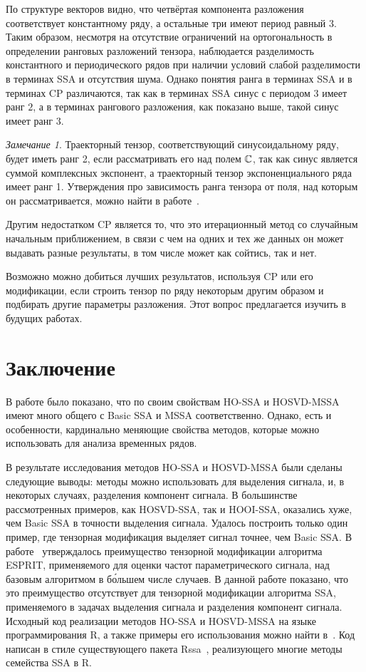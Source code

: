 \documentclass[specialist,
    substylefile = spbu.rtx,
    subf,href,colorlinks=true, 12pt]{disser}
\theoremstyle{plain}
\theoremstyle{definition}
\theoremstyle{remark}
\newtheorem*{remark}{Замечание}
\begin{document}
    По структуре векторов видно, что четвёртая компонента разложения соответствует константному ряду, а остальные три имеют период равный $3$.
    Таким образом, несмотря на отсутствие ограничений на ортогональность в определении ранговых разложений тензора, наблюдается
    разделимость константного и периодического рядов при наличии условий слабой разделимости в терминах SSA и отсутствия
    шума.
    Однако понятия ранга в терминах SSA и в терминах CP различаются, так как в терминах SSA синус с периодом $3$ имеет ранг $2$, а в
    терминах рангового разложения, как показано выше, такой синус имеет ранг $3$.
    \begin{remark}
        Траекторный тензор, соответствующий синусоидальному ряду, будет иметь ранг 2, если рассматривать его
        над полем $\mathbb{C}$, так как синус является суммой комплексных экспонент, а траекторный тензор экспоненциального
        ряда имеет ранг 1.
        Утверждения про зависимость ранга тензора от поля, над которым он рассматривается, можно найти в
        работе~\cite{tensors-bg}.
    \end{remark}

    Другим недостатком CP является то, что это итерационный метод со случайным начальным приближением, в связи
    с чем на одних и тех же данных он может выдавать разные результаты, в том числе может как сойтись, так и нет.

    Возможно можно добиться лучших результатов, используя CP или его модификации, если строить тензор по ряду
    некоторым другим образом и подбирать другие параметры разложения.
    Этот вопрос предлагается изучить в будущих работах.
    \newpage


    \section{Заключение}\label{sec:conclusion}
    В работе было показано, что по своим свойствам HO-SSA и HOSVD-MSSA имеют много общего
    с Basic SSA и MSSA соответственно.
    Однако, есть и особенности, кардинально меняющие свойства методов, которые можно использовать для анализа временных рядов.

    В результате исследования методов HO-SSA и HOSVD-MSSA были сделаны следующие выводы:
    методы можно использовать для выделения сигнала, и, в некоторых случаях, разделения компонент сигнала.
    В большинстве рассмотренных примеров, как HOSVD-SSA, так и HOOI-SSA, оказались хуже,
    чем Basic SSA в точности выделения сигнала.
    Удалось построить только один пример, где тензорная модификация выделяет сигнал точнее, чем Basic SSA.
    В работе~\cite{hosvd-hooi-separation} утверждалось преимущество тензорной модификации алгоритма
    ESPRIT, применяемого для оценки частот параметрического сигнала, над базовым алгоритмом в б\'{о}льшем числе случаев.
    В данной работе показано, что это преимущество отсутствует для тензорной модификации алгоритма SSA, применяемого в задачах выделения сигнала и разделения компонент сигнала.
    Исходный код реализации методов HO-SSA и HOSVD-MSSA на языке программирования R, а также
    примеры его использования можно найти в~\cite{Rcode}.
    Код написан в стиле существующего пакета Rssa~\cite{Rssa}, реализующего многие методы семейства SSA в R.
\end{document}
